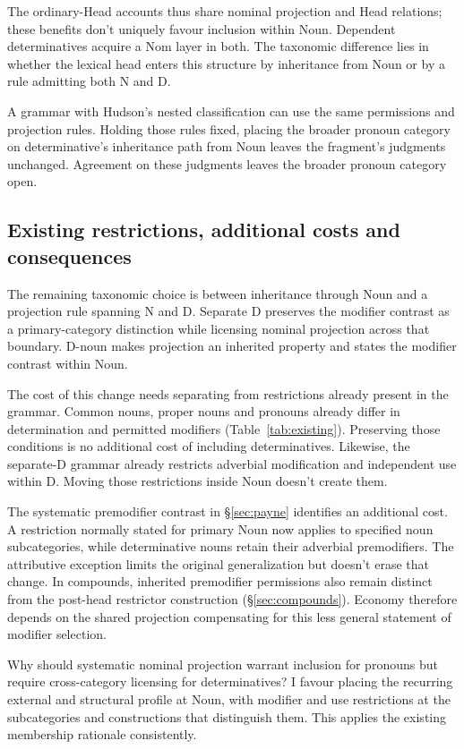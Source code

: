 \documentclass[12pt]{article}
\begin{document}
The ordinary-Head accounts thus share nominal projection and Head relations; these benefits don't uniquely favour inclusion within Noun. Dependent determinatives acquire a Nom layer in both. The taxonomic difference lies in whether the lexical head enters this structure by inheritance from Noun or by a rule admitting both N and D.

A grammar with Hudson's nested classification can use the same permissions and projection rules. Holding those rules fixed, placing the broader pronoun category on determinative's inheritance path from Noun leaves the fragment's judgments unchanged. Agreement on these judgments leaves the broader pronoun category open.

\subsection{Existing restrictions, additional costs and consequences}\label{sec:costs}

The remaining taxonomic choice is between inheritance through Noun and a projection rule spanning N and D. Separate D preserves the modifier contrast as a primary-category distinction while licensing nominal projection across that boundary. D-noun makes projection an inherited property and states the modifier contrast within Noun.

The cost of this change needs separating from restrictions already present in the grammar. Common nouns, proper nouns and pronouns already differ in determination and permitted modifiers (Table~\ref{tab:existing}). Preserving those conditions is no additional cost of including determinatives. Likewise, the separate-D grammar already restricts adverbial modification and independent use within D. Moving those restrictions inside Noun doesn't create them.

The systematic premodifier contrast in §\ref{sec:payne} identifies an additional cost. A restriction normally stated for primary Noun now applies to specified noun subcategories, while determinative nouns retain their adverbial premodifiers. The attributive  exception limits the original generalization but doesn't erase that change. In compounds, inherited premodifier permissions also remain distinct from the post-head restrictor construction (§\ref{sec:compounds}). Economy therefore depends on the shared projection compensating for this less general statement of modifier selection.

Why should systematic nominal projection warrant inclusion for pronouns but require cross-category licensing for determinatives? I favour placing the recurring external and structural profile at Noun, with modifier and use restrictions at the subcategories and constructions that distinguish them. This applies the existing membership rationale consistently.
\end{document}
